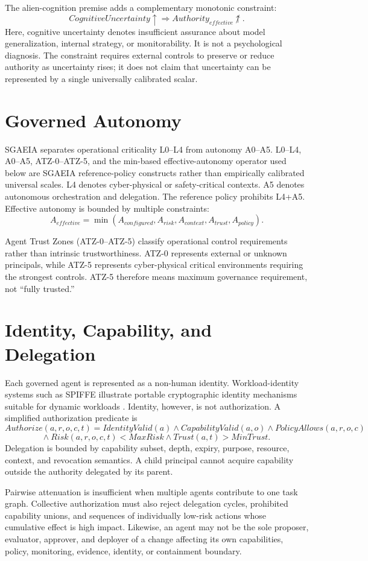 \documentclass[11pt]{article}
\newcommand{\sgaeia}{\textsc{SGAEIA}}
\begin{document}
The alien-cognition premise adds a complementary monotonic constraint:
\[
CognitiveUncertainty\uparrow \Rightarrow Authority_{effective}\not\uparrow.
\]
Here, cognitive uncertainty denotes insufficient assurance about model generalization, internal strategy, or monitorability. It is not a psychological diagnosis. The constraint requires external controls to preserve or reduce authority as uncertainty rises; it does not claim that uncertainty can be represented by a single universally calibrated scalar.

\section{Governed Autonomy}
\sgaeia{} separates operational criticality L0--L4 from autonomy A0--A5. L0--L4, A0--A5, ATZ-0--ATZ-5, and the min-based effective-autonomy operator used below are \sgaeia{} reference-policy constructs rather than empirically calibrated universal scales. L4 denotes cyber-physical or safety-critical contexts. A5 denotes autonomous orchestration and delegation. The reference policy prohibits L4+A5. Effective autonomy is bounded by multiple constraints:
\[
A_{effective}=\min(A_{configured},A_{risk},A_{context},A_{trust},A_{policy}).
\]

Agent Trust Zones (ATZ-0--ATZ-5) classify operational control requirements rather than intrinsic trustworthiness. ATZ-0 represents external or unknown principals, while ATZ-5 represents cyber-physical critical environments requiring the strongest controls. ATZ-5 therefore means maximum governance requirement, not ``fully trusted.''

\section{Identity, Capability, and Delegation}
Each governed agent is represented as a non-human identity. Workload-identity systems such as SPIFFE illustrate portable cryptographic identity mechanisms suitable for dynamic workloads \cite{spiffe}. Identity, however, is not authorization. A simplified authorization predicate is
\[
Authorize(a,r,o,c,t)=IdentityValid(a)\land CapabilityValid(a,o)\land PolicyAllows(a,r,o,c)
\]
\[
\land\ Risk(a,r,o,c,t)<MaxRisk\land Trust(a,t)>MinTrust.
\]
Delegation is bounded by capability subset, depth, expiry, purpose, resource, context, and revocation semantics. A child principal cannot acquire capability outside the authority delegated by its parent.

Pairwise attenuation is insufficient when multiple agents contribute to one task graph. Collective authorization must also reject delegation cycles, prohibited capability unions, and sequences of individually low-risk actions whose cumulative effect is high impact. Likewise, an agent may not be the sole proposer, evaluator, approver, and deployer of a change affecting its own capabilities, policy, monitoring, evidence, identity, or containment boundary.
\end{document}
